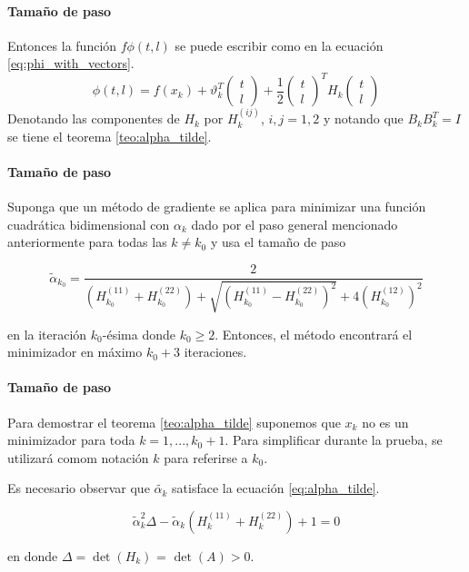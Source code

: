 \begin{frame}{\insertsectionhead}
    \framesubtitle{Tamaño de paso}
    Entonces la función $f\phi(t, l)$ se puede escribir como en la ecuación \ref{eq:phi_with_vectors}.
    \begin{equation}
        \phi(t, l) =  f(x_k)+\vartheta_k^T
        \begin{pmatrix}
            t \\l
        \end{pmatrix} +\frac{1}{2}
        \begin{pmatrix}
            t \\l
        \end{pmatrix}^T
        H_k
        \begin{pmatrix}
            t \\l
        \end{pmatrix} \label{eq:phi_with_vectors}
    \end{equation}
    Denotando las componentes de $H_k$ por $H_k^(ij)$, $i,j = 1,2$ y notando que $B_kB^T_k = I$ se tiene el teorema \ref{teo:alpha_tilde}.
\end{frame}

\begin{frame}{\insertsectionhead}
    \framesubtitle{Tamaño de paso}
    \begin{teor}

        Suponga que un método de gradiente se aplica para minimizar una función cuadrá\-tica bidimensional con $\alpha_k$ dado por el paso general mencionado anteriormente para todas las $k\neq k_0$ y usa el tamaño de paso

        \begin{equation*}
            \tilde{\alpha}_{k_0} = \frac{2}{\left(H^{(11)}_{k_0} + H^{(22)}_{k_0}\right)+\sqrt{\left(H^{(11)}_{k_0} - H^{(22)}_{k_0}\right)^2 } + 4\left(H_{k_0}^{(12)}\right)^2}
        \end{equation*}

        en la iteración $k_0$-ésima donde $k_0\geq 2$. Entonces, el método encontrará el minimizador en máximo $k_0+3$ iteraciones.
        \label{teo:alpha_tilde}
    \end{teor}
\end{frame}

\begin{frame}{\insertsectionhead}
    \framesubtitle{Tamaño de paso}
    Para demostrar el teorema \ref{teo:alpha_tilde} suponemos que $x_k$ no es un minimizador para toda $k=1, ..., k_0+1$. Para simplificar durante la prueba, se utilizará comom notación $k$ para referirse a $k_0$.

    Es necesario observar que $\tilde{\alpha_k}$ satisface la ecuación \ref{eq:alpha_tilde}.

    \begin{equation}
        \tilde{\alpha}^2_k\Delta-\tilde{\alpha}_k\left(H^{(11)}_k + H_k^{(22)}\right) + 1 = 0
        \label{eq:alpha_tilde}
    \end{equation}

    en donde $\Delta = \det{(H_k)}$ = $\det{(A)}>0$.
\end{frame}

